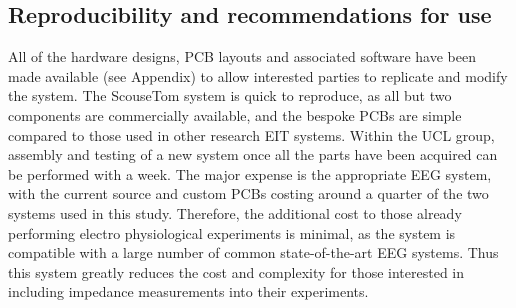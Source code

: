 \subsection{Reproducibility and recommendations for use}
All of the hardware designs, PCB layouts and associated software have been made available (see Appendix) to allow interested parties to replicate and modify the system. The ScouseTom system is quick to reproduce, as all but two components are commercially available, and the bespoke PCBs are simple compared to those used in other research EIT systems. Within the UCL group, assembly and testing of a new system once all the parts have been acquired can be performed with a week. The major expense is the appropriate EEG system, with the current source and custom PCBs costing around a quarter of the two systems used in this study. Therefore, the additional cost to those already performing electro physiological experiments is minimal, as the system is compatible with  a large number of common state-of-the-art EEG systems. Thus this system greatly reduces the cost and complexity for those interested in including impedance measurements into their experiments.